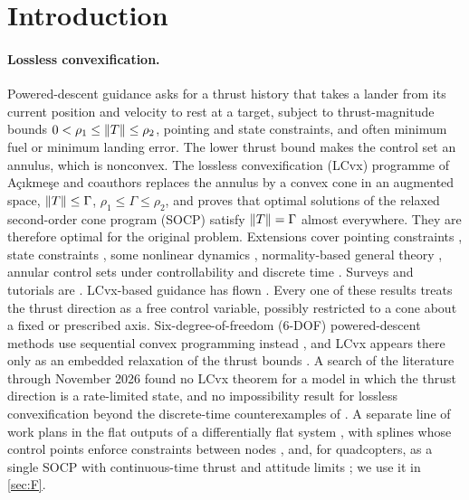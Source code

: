 \section{Introduction}\label{sec:intro}

\paragraph{Lossless convexification.}
Powered-descent guidance asks for a thrust history that takes a lander from its current position and velocity
to rest at a target, subject to thrust-magnitude bounds $0<\rho_1\le\lVert T\rVert\le\rho_2$, pointing and state constraints,
and often minimum fuel or minimum landing error. The lower thrust bound makes the control set an annulus, which is
nonconvex. The lossless convexification (LCvx) programme of A\c{c}\i kme\c{s}e and coauthors
\cite{acikmese2005gnc,acikmese2007jgcd,acikmese2011automatica,acikmese2013tcst,blackmore2010jgcd} replaces the annulus
by a convex cone in an augmented space, $\lVert T\rVert\le\Gamma$, $\rho_1\le\Gamma\le\rho_2$, and proves that optimal
solutions of the relaxed second-order cone program (SOCP) satisfy $\lVert T\rVert=\Gamma$ almost everywhere. They are
therefore optimal for the original problem. Extensions cover pointing constraints \cite{carson2011acc,acikmese2013tcst},
state constraints \cite{harris2013cdc,harris2014automatica}, some nonlinear dynamics \cite{blackmore2012scl},
normality-based general theory \cite{harris2021tac}, annular control sets under controllability \cite{kunhippurayil2021automatica} and discrete
time \cite{luo2026automatica}. Surveys and tutorials are \cite{malyuta2021survey,malyuta2022csm}. LCvx-based guidance
has flown \cite{acikmese2013flight,scharf2014aero}. Every one of these results treats the thrust direction as a free
control variable, possibly restricted to a cone about a fixed or prescribed axis. Six-degree-of-freedom (6-DOF)
powered-descent methods use sequential convex programming instead \cite{szmuk2018gnc,szmuk2020jgcd,reynolds2020dq,reynolds2020ptr,elango2025automatica},
and LCvx appears there only as an embedded relaxation of the thrust bounds \cite{malyuta2022csm}. A search of the
literature through November 2026 found no LCvx theorem for a model in which the thrust direction is a
rate-limited state, and no impossibility result for lossless convexification beyond the discrete-time counterexamples of
\cite{luo2026automatica}. A separate line of work plans in the flat outputs of a differentially flat system
\cite{fliess1995ijc,martin1996automatica,mellinger2011icra,desiderio2013tcst}, with splines whose control points enforce constraints
between nodes \cite{vanloock2015acc}, and, for quadcopters, as a single SOCP with continuous-time thrust and attitude limits
\cite{freire2023tcst}; we use it in \cref{sec:F}.

